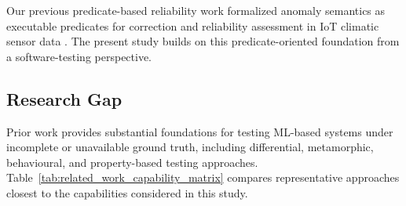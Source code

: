 \documentclass[preprint,12pt]{elsarticle}
\begin{document}
Our previous predicate-based reliability work formalized anomaly semantics as
executable predicates for correction and reliability assessment in IoT
climatic sensor data \cite{carrero2026qrs}. The present study builds on this
predicate-oriented foundation from a software-testing perspective.


\subsection{Research Gap}

Prior work provides substantial foundations for testing ML-based systems
under incomplete or unavailable ground truth, including differential,
metamorphic, behavioural, and property-based testing approaches.
Table~\ref{tab:related_work_capability_matrix} compares representative
approaches closest to the capabilities considered in this study.
\end{document}
